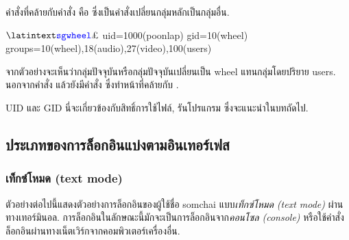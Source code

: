 \begin{thwbr}
คำสั่งที่คล้ายกับคำสั่ง  คือ  ซึ่งเป็นคำสั่งเปลี่ยนกลุ่มหลักเป็นกลุ่มอื่น.
\begin{MyExample}
\begin{MyEx}
$ \cin{sg wheel}
$ 
uid=1000(poonlap) gid=10(wheel) groups=10(wheel),18(audio),27(video),100(users)
\end{MyEx}
\end{MyExample}
จากตัวอย่างจะเห็นว่ากลุ่มปัจจุบันหรือกลุ่มปัจจุบันเปลี่ยนเป็น wheel แทนกลุ่มโดยปริยาย users. นอกจากคำสั่ง  แล้วยังมีคำสั่ง  ซึ่งทำหน้าที่คล้ายกับ .

UID และ GID นี่จะเกี่ยวข้องกับสิทธิ์การใช้ไฟล์, รันโปรแกรม ซึ่งจะแนะนำในบทถัดไป.

\subsection{ประเภทของการล็อกอินแบ่งตามอินเทอร์เฟส}
\subsubsection{เท็กซ์โหมด (text mode)}%
%
%
ตัวอย่างต่อไปนี้แสดงตัวอย่างการล็อกอินของผู้ใช้ชื่อ somchai แบบ\emph{เท็กซ์โหมด (text mode)} ผ่านทางเทอร์มินอล. การล็อกอินในลักษณะนี้มักจะเป็นการล็อกอินจาก\emph{คอนโซล (console)} หรือใช้คำสั่ง %
ล็อกอินผ่านทางเน็ตเวิร์กจากคอมพิวเตอร์เครื่องอื่น.


\begin{MyExample}\label{ex:prompt}
\end{MyExample}%


\end{thwbr}
